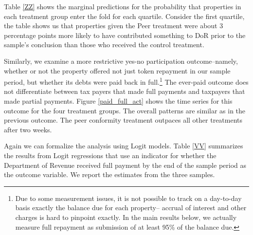 \documentclass[12pt,titlepage]{article}
\begin{document}
Table \ref{ZZ} shows the marginal predictions for the probability that
properties in each treatment group enter the fold for each
quartile. Consider the first quartile, the table shows us that
properties given the Peer treatment were about 3 percentage points
more likely to have contributed something to DoR prior to the sample's
conclusion than those who received the control treatment.

Similarly, we examine a more restrictive yes-no participation
outcome--namely, whether or not the property offered not just token
repayment in our sample period, but whether its debts were paid back
in full.\footnote{Due to some measurement issues, it is not possible
  to track on a day-to-day basis exactly the balance due for each
  property-- accrual of interest and other charges is hard to pinpoint
  exactly. In the main results below, we actually measure full
  repayment as submission of at least 95\% of the balance due.}  The
ever-paid outcome does not differentiate between tax payers that made
full payments and taxpayers that made partial payments. Figure
\ref{paid_full_act} shows the time series for this outcome for the
four treatment groups. The overall patterns are similar as in the
previous outcome. The peer conformity treatment outpaces all other
treatments after two weeks.

Again we can formalize the analysis using Logit models. Table \ref{VV}
summarizes the results from Logit regressions that use an indicator
for whether the Department of Revenue received full payment by the end
of the sample period as the outcome variable. We report the estimates
from the three samples.
\end{document}
